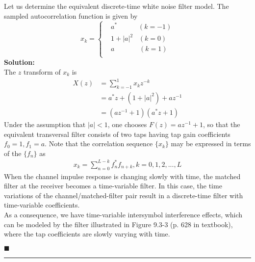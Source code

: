 \documentclass[a4paper,12pt]{article}
\begin{document}
\begin{enumerate}
            Let us determine the equivalent discrete-time white noise filter model. The sampled autocorrelation function is given by 
            $$x_k = \left\{ 
            \begin{aligned}
                & a^* \;\;\;\;\;\;\;\;\;\;\; (k = -1) \\
                & 1 + |a|^2 \;\;\; (k = 0) \\ 
                & a \;\;\;\;\;\;\;\;\;\;\;\;\; (k = 1) \\
            \end{aligned}
            \right.
            $$
            \textbf{Solution:} \\ 
            The $z$ transform of $x_k$ is 
            \begin{align*}
                X(z) &= \sum_{k = -1}^{1} x_k z^{-k} \\
                     &= a^*z + (1 + |a|^2) + az^{-1} \\ 
                     &= (az^{-1} + 1)(a^*z + 1) 
            \end{align*}
            Under the assumption that $|a| < 1$, one chooses $F(z) = az^{-1} + 1$, so that the equivalent transversal filter consists of two taps having tap gain coefficients $f_0 = 1, f_1 = a$. Note that the correlation sequence $\{ x_k \}$ may be expressed in terms of the $\{ f_n \}$ as 
            \begin{align*}
                x_k = \sum_{n = 0}^{L - k} f_n^*f_{n + k}, k = 0, 1, 2, ..., L
            \end{align*}
            When the channel impulse response is changing slowly with time, the matched filter at the receiver becomes a time-variable filter. In this case, the time variations of the channel/matched-filter pair result in a discrete-time filter with time-variable coefficients. \\ 
            As a consequence, we have time-variable intersymbol interference effects, which can be modeled by the filter illustrated in Figure 9.3-3 (p. 628 in textbook), where the tap coefficients are slowly varying with time. 
            \begin{flushright}
                $\blacksquare$
            \end{flushright}
    \end{enumerate}
    \rule{\textwidth}{0.4pt}
\end{document}
